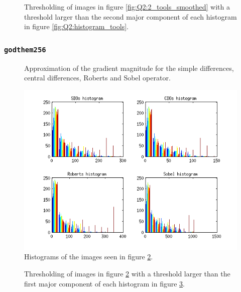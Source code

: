 \begin{figure}[H]
	\centering
	\scalebox{0.9}{}
	\caption{Thresholding of images in figure \ref{fig:Q2:2_tools_smoothed} with a threshold larger than the second major component of
	each histogram in figure \ref{fig:Q2:histogram_tools}.}
	\label{fig:Q2:threshold_tools_smoothed_2}
\end{figure}




\subsubsection{\texttt{godthem256}}

\begin{figure}[H]
	\centering
	\scalebox{0.7}{}
	\caption{Approximation of the gradient magnitude for the simple differences, central differences, Roberts and Sobel operator.}
	\label{fig:Q2:2_house}
\end{figure}

\begin{figure}[H]
	\centering
	\includegraphics[scale=0.8]{./images/Q2/house/histogram_2.png}
	\caption{Histograms of the images seen in figure \ref{fig:Q2:2_house}.}
	\label{fig:Q2:histogram_house}
\end{figure}


\begin{figure}[H]
	\centering
	\scalebox{0.9}{}
	\caption{Thresholding of images in figure \ref{fig:Q2:2_house} with a threshold larger than the first major component of
	each histogram in figure \ref{fig:Q2:histogram_house}.}
	\label{fig:Q2:threshold_house_1}
\end{figure}

